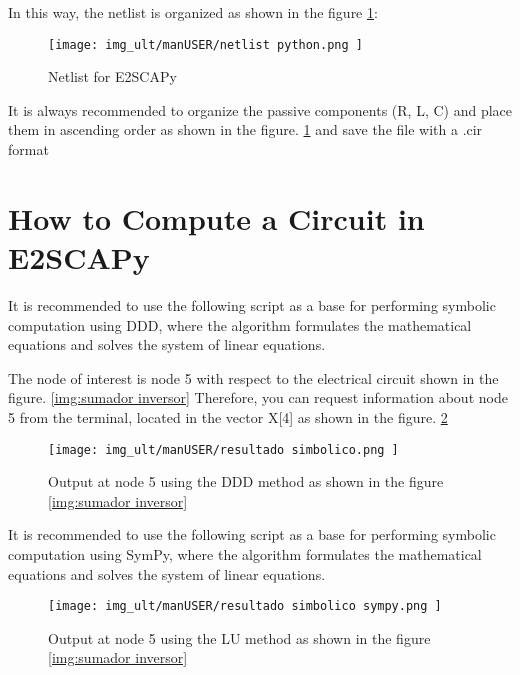 In this way, the netlist is organized as shown in the figure \ref{img:netlist python}: 

\begin{figure}[H]
	\centering\texttt{[image: img\_ult/manUSER/netlist python.png
	]}
	\caption{Netlist for E2SCAPy}
	\label{img:netlist python}
\end{figure} 

It is always recommended to organize the passive components (R, L, C) and place them in ascending order as shown in the figure. \ref{img:netlist python} and save the file with a .cir format

\newpage

\section{How to Compute a Circuit in E2SCAPy}
It is recommended to use the following script as a base for performing symbolic computation using DDD, where the algorithm formulates the mathematical equations and solves the system of linear equations.



The node of interest is node 5 with respect to the electrical circuit shown in the figure. \ref{img:sumador inversor} Therefore, you can request information about node 5 from the terminal, located in the vector X[4] as shown in the figure. \ref{img:output analisis simbolico}

\begin{figure}[H]
	\centering\texttt{[image: img\_ult/manUSER/resultado simbolico.png
	]}
	\caption{Output at node 5 using the DDD method as shown in the figure \ref{img:sumador inversor}}
	\label{img:output analisis simbolico}
\end{figure} 


It is recommended to use the following script as a base for performing symbolic computation using SymPy, where the algorithm formulates the mathematical equations and solves the system of linear equations.



\begin{figure}[H]
	\centering\texttt{[image: img\_ult/manUSER/resultado simbolico sympy.png
	]}
	\caption{Output at node 5 using the LU method as shown in the figure \ref{img:sumador inversor}}
	\label{img:output analisis simbolico 2}
\end{figure} 

